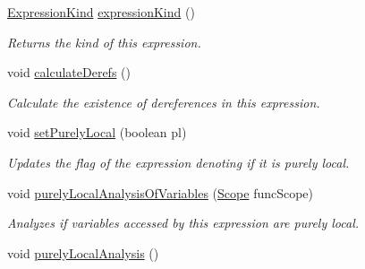 \begin{DoxyCompactItemize}
\item 
\hyperlink{enumedu_1_1udel_1_1cis_1_1vsl_1_1civl_1_1model_1_1IF_1_1expression_1_1Expression_1_1ExpressionKind}{Expression\+Kind} \hyperlink{classedu_1_1udel_1_1cis_1_1vsl_1_1civl_1_1model_1_1common_1_1expression_1_1CommonSubscriptExpression_ae4330a9ed3afe3a704504f4a539e77c5}{expression\+Kind} ()
\begin{DoxyCompactList}\small\item\em Returns the kind of this expression. \end{DoxyCompactList}\item 
\hypertarget{classedu_1_1udel_1_1cis_1_1vsl_1_1civl_1_1model_1_1common_1_1expression_1_1CommonSubscriptExpression_aa1b4526955f29e459db71a3e44335ffa}{}void \hyperlink{classedu_1_1udel_1_1cis_1_1vsl_1_1civl_1_1model_1_1common_1_1expression_1_1CommonSubscriptExpression_aa1b4526955f29e459db71a3e44335ffa}{calculate\+Derefs} ()\label{classedu_1_1udel_1_1cis_1_1vsl_1_1civl_1_1model_1_1common_1_1expression_1_1CommonSubscriptExpression_aa1b4526955f29e459db71a3e44335ffa}

\begin{DoxyCompactList}\small\item\em Calculate the existence of dereferences in this expression. \end{DoxyCompactList}\item 
void \hyperlink{classedu_1_1udel_1_1cis_1_1vsl_1_1civl_1_1model_1_1common_1_1expression_1_1CommonSubscriptExpression_a404179bd4464ddf369134d4685a91d02}{set\+Purely\+Local} (boolean pl)
\begin{DoxyCompactList}\small\item\em Updates the flag of the expression denoting if it is purely local. \end{DoxyCompactList}\item 
void \hyperlink{classedu_1_1udel_1_1cis_1_1vsl_1_1civl_1_1model_1_1common_1_1expression_1_1CommonSubscriptExpression_aecce7d19d063fb49610324edc68dc82a}{purely\+Local\+Analysis\+Of\+Variables} (\hyperlink{interfaceedu_1_1udel_1_1cis_1_1vsl_1_1civl_1_1model_1_1IF_1_1Scope}{Scope} func\+Scope)
\begin{DoxyCompactList}\small\item\em Analyzes if variables accessed by this expression are purely local. \end{DoxyCompactList}\item 
\hypertarget{classedu_1_1udel_1_1cis_1_1vsl_1_1civl_1_1model_1_1common_1_1expression_1_1CommonSubscriptExpression_a3749b1e2494f5f977cc99ad1b116b131}{}void \hyperlink{classedu_1_1udel_1_1cis_1_1vsl_1_1civl_1_1model_1_1common_1_1expression_1_1CommonSubscriptExpression_a3749b1e2494f5f977cc99ad1b116b131}{purely\+Local\+Analysis} ()\label{classedu_1_1udel_1_1cis_1_1vsl_1_1civl_1_1model_1_1common_1_1expression_1_1CommonSubscriptExpression_a3749b1e2494f5f977cc99ad1b116b131}


\end{DoxyCompactItemize}
